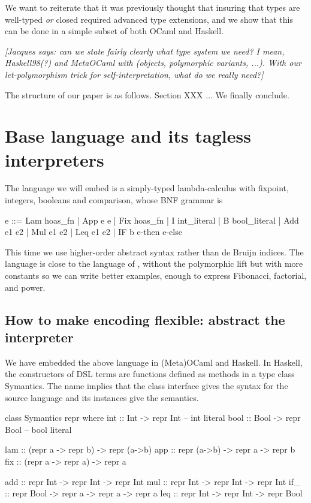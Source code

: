 \documentclass[preprint]{sigplanconf}
\newcommand{\jacques}[1]{{\it [Jacques says: #1]}}
\let\cite=\citep
\begin{document}
We want to reiterate that it was previously thought that insuring
that types are well-typed \emph{or} closed required advanced type
extensions, and we show that this can be done in a simple subset
of both OCaml and Haskell.

\jacques{can we state fairly clearly what type system we need?  I mean,
Haskell98(?) and MetaOCaml with (objects, polymorphic variants, ...).
With our let-polymorphism trick for self-interpretation, what do we really
need?}

The structure of our paper is as follows. Section XXX ...
We finally conclude.

\section{Base language and its tagless interpreters}\label{language}

The language we will embed is a simply-typed lambda-calculus
with fixpoint, integers, booleans and comparison, whose BNF grammar is

\begin{code}
  e ::= Lam hoas_fn | App e e | Fix hoas_fn |
  I int_literal | B bool_literal | Add e1 e2 | 
  Mul e1 e2 | Leq e1 e2 | IF b e-then e-else
\end{code}

This time we use higher-order abstract syntax \cite{DaleMiller}
rather than de Bruijn indices.  The
language is close to the language of \cite{XiPOPL03}, without the polymorphic
lift but with more constants so we can write better examples, enough to
express Fibonacci, factorial, and power.

\subsection{How to make encoding flexible: abstract the interpreter}
\label{encoding}
We have embedded the above language in (Meta)OCaml and Haskell.  In Haskell,
the constructors of DSL terms are functions defined as methods in a type class
Symantics. The name implies that the class interface gives the syntax for
the source language and its instances give the semantics.

\begin{code}
class Symantics repr where
  int :: Int   -> repr Int          -- int literal
  bool :: Bool -> repr Bool         -- bool literal

  lam :: (repr a -> repr b) -> repr (a->b)
  app :: repr (a->b) -> repr a -> repr b
  fix :: (repr a -> repr a) -> repr a

  add :: repr Int  -> repr Int -> repr Int
  mul :: repr Int  -> repr Int -> repr Int
  if_ :: repr Bool -> repr a   -> repr a -> repr a
  leq :: repr Int  -> repr Int -> repr Bool
\end{code}
\end{document}
